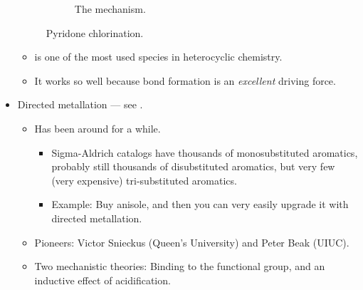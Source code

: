 \documentclass[../notes.tex]{subfiles}
\begin{document}
\begin{itemize}
\begin{figure}[h!]
\begin{subfigure}[b]{\linewidth}
            \schemestop
            \caption{The mechanism.}
            \label{fig:pyridoneClb}
        \end{subfigure}
        \caption{Pyridone chlorination.}
        \label{fig:pyridoneCl}
    \end{figure}
    \begin{itemize}
        \item {} is one of the most used species in heterocyclic chemistry.
        \item It works so well because  bond formation is an \emph{excellent} driving force.
    \end{itemize}
    \item Directed metallation --- see \textcite{bib:5-511Notes}.
    \begin{itemize}
        \item Has been around for a while.
        \begin{itemize}
            \item Sigma-Aldrich catalogs have thousands of monosubstituted aromatics, probably still thousands of disubstituted aromatics, but very few (very expensive) tri-substituted aromatics.
            \item Example: Buy anisole, and then you can very easily upgrade it with directed metallation.
        \end{itemize}
        \item Pioneers: Victor Snieckus (Queen's University) and Peter Beak (UIUC).
        \item Two mechanistic theories: Binding to the functional group, and an inductive effect of acidification.
        \begin{itemize}

\end{itemize}
\end{itemize}
\end{itemize}
\end{document}

